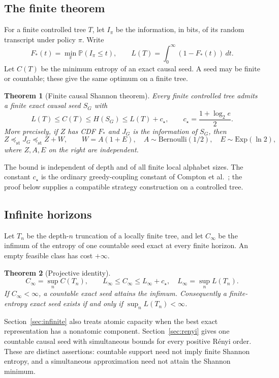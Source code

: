 \documentclass[11pt,a4paper]{article}
\newtheorem{theorem}{Theorem}[section]
\theoremstyle{definition}\newtheorem{definition}[theorem]{Definition}
\theoremstyle{remark}\newtheorem{remark}[theorem]{Remark}
\newcommand{\Pp}{\mathbb P}
\newcommand{\st}{\preceq_{\mathrm{st}}}
\numberwithin{equation}{section}
\begin{document}
\subsection{The finite theorem}
For a finite controlled tree $T$, let $I_\pi$ be the information, in bits,
of its random transcript under policy $\pi$. Write
\[
 F_*(t)=\min_\pi\Pp(I_\pi\le t),\qquad
 L(T)=\int_0^\infty(1-F_*(t))\,dt.
\]
Let $C(T)$ be the minimum entropy of an exact causal seed. A seed may
be finite or countable; these give the same optimum on a finite tree.

\begin{theorem}[Finite causal Shannon theorem]\label{thm:finite}
Every finite controlled tree admits a finite exact causal seed $S_G$ with
\begin{equation}\label{eq:sandwich}
 L(T)\le C(T)\le H(S_G)\le L(T)+c_\star,
 \qquad c_\star=\frac{1+\log_2 e}{2}.
\end{equation}
More precisely, if $Z$ has CDF $F_*$ and $J_G$ is the information of $S_G$,
then
\begin{equation}\label{eq:stoch}
 Z\st J_G\st Z+W,\qquad
 W=A(1+E),\quad A\sim\mathrm{Bernoulli}(1/2),\quad
 E\sim\mathrm{Exp}(\ln2),
\end{equation}
where $Z,A,E$ on the right are independent.
\end{theorem}
The bound is independent of depth and of all finite local alphabet sizes.
The constant $c_\star$ is the ordinary greedy-coupling constant of
Compton et al.~\cite{compton}; the proof below supplies a compatible
strategy construction on a controlled tree.

\subsection{Infinite horizons}
Let $T_n$ be the depth-$n$ truncation of a locally finite tree, and let
$C_\infty$ be the infimum of the entropy of one countable seed exact at
every finite horizon. An empty feasible class has cost $+\infty$.
\begin{theorem}[Projective identity]\label{thm:infinite}
\[
 C_\infty=\sup_n C(T_n),\qquad
 L_\infty\le C_\infty\le L_\infty+c_\star,
 \quad L_\infty=\sup_n L(T_n).
\]
If $C_\infty<\infty$, a countable exact seed attains the infimum.
Consequently a finite-entropy exact seed exists if and only if
$\sup_n L(T_n)<\infty$.
\end{theorem}
Section~\ref{sec:infinite} also treats atomic capacity when the best exact
representation has a nonatomic component. Section~\ref{sec:renyi} gives
one countable causal seed with simultaneous bounds for every positive
R\'enyi order. These are distinct assertions: countable support need not
imply finite Shannon entropy, and a simultaneous approximation need not
attain the Shannon minimum.
\end{document}

